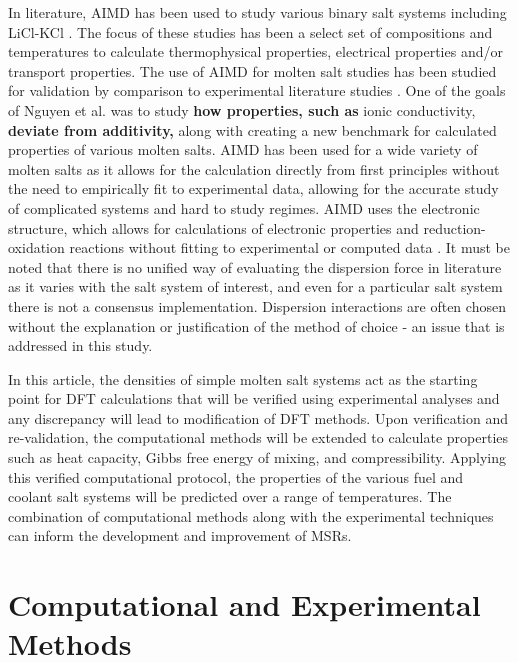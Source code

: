 \documentclass[review]{elsarticle}
\providecommand{\DIFaddtex}[1]{{\bf #1}} %
\providecommand{\DIFdeltex}[1]{} %
\providecommand{\DIFaddbegin}{\protect\color{blue}} %
\providecommand{\DIFaddend}{\protect\color{black}} %
\providecommand{\DIFdelbegin}{\protect\color{red}} %
\providecommand{\DIFdelend}{\protect\color{black}} %
\providecommand{\DIFadd}[1]{\texorpdfstring{\DIFaddtex{#1}}{#1}} %
\providecommand{\DIFdel}[1]{\texorpdfstring{\DIFdeltex{#1}}{}} %
\newcommand{\DIFscaledelfig}{0.5}
\newlength{\DIFdelgraphicswidth} %
\newlength{\DIFdelgraphicsheight} %
\newcommand{\DIFaddincludegraphics}[2][]{{\color{blue}\fbox{\DIFOincludegraphics[#1]{#2}}}} %
\newcommand{\DIFdelincludegraphics}[2][]{%
\sbox{\DIFdelgraphicsbox}{\DIFOincludegraphics[#1]{#2}}%
\settoboxwidth{\DIFdelgraphicswidth}{\DIFdelgraphicsbox} %
\settoboxtotalheight{\DIFdelgraphicsheight}{\DIFdelgraphicsbox} %
\scalebox{\DIFscaledelfig}{%
\parbox[b]{\DIFdelgraphicswidth}{\usebox{\DIFdelgraphicsbox}\\[-\baselineskip] \rule{\DIFdelgraphicswidth}{0em}}\llap{\resizebox{\DIFdelgraphicswidth}{\DIFdelgraphicsheight}{%
\setlength{\unitlength}{\DIFdelgraphicswidth}%
\begin{picture}(1,1)%
\thicklines\linethickness{2pt} %
{\color[rgb]{1,0,0}\put(0,0){\framebox(1,1){}}}%
{\color[rgb]{1,0,0}\put(0,0){\line( 1,1){1}}}%
{\color[rgb]{1,0,0}\put(0,1){\line(1,-1){1}}}%
\end{picture}%
}\hspace*{3pt}}} %
} %
\DeclareRobustCommand{\DIFaddbegin}{\DIFOaddbegin \let\includegraphics\DIFaddincludegraphics} %
\DeclareRobustCommand{\DIFaddend}{\DIFOaddend \let\includegraphics\DIFOincludegraphics} %
\DeclareRobustCommand{\DIFdelbegin}{\DIFOdelbegin \let\includegraphics\DIFdelincludegraphics} %
\DeclareRobustCommand{\DIFdelend}{\DIFOaddend \let\includegraphics\DIFOincludegraphics} %
\begin{document}
In literature, AIMD has been used to study various \DIFdelbegin \DIFdel{different }\DIFdelend binary salt systems including LiCl-KCl \cite{Bengston2014,NGUYEN2021}. The focus of these studies has been a select set of compositions and temperatures to calculate thermophysical properties, electrical properties and/or transport properties. The use of AIMD for molten salt studies has been studied for validation by comparison to experimental literature studies \cite{Bengston2014}. One of the goals of Nguyen et al. \cite{NGUYEN2021} was to study \DIFdelbegin \DIFdel{properties with deviate from additivity, like }\DIFdelend \DIFaddbegin \DIFadd{how properties, such as }\DIFaddend ionic conductivity, \DIFaddbegin \DIFadd{deviate from additivity, }\DIFaddend along with creating a new benchmark for calculated properties of various molten salts. AIMD has been used for a wide variety of molten salts as it allows for the calculation directly from first principles without the need to empirically fit to experimental data, allowing for the accurate study of complicated systems and hard to study regimes. AIMD uses the electronic structure, which allows for calculations of electronic properties and reduction-oxidation reactions without fitting to experimental or computed data \cite{Bengston2014}. It must be noted that there is no unified way of evaluating the dispersion force in literature as it varies with the salt system of interest, and even for a particular salt system there is not a consensus implementation. Dispersion interactions are often chosen without the explanation or justification of the method of choice - an issue that is addressed in this study.

 In this article, the densities of simple molten salt systems act as the starting point for DFT calculations that will be verified using experimental analyses and any discrepancy will lead to modification of DFT methods. Upon verification and re-validation, the computational methods will be extended to calculate properties such as heat capacity, Gibbs free energy of mixing, and compressibility. Applying this verified computational protocol, the properties of the various fuel and coolant salt systems will be predicted over a range of temperatures. The combination of computational methods along with the experimental techniques can inform the development and improvement of MSRs. 


\section{Computational and Experimental Methods}
\end{document}
